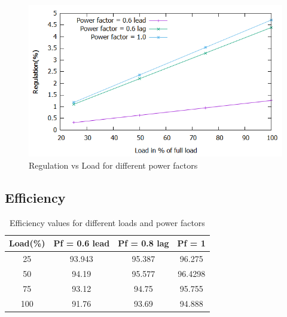 \documentclass[12pt]{article}
\begin{document}
            \begin{figure}[H]
                \centering
                \includegraphics[width = \linewidth]{LAB-2/Regu_vs_load.png}
                \caption{Regulation vs Load for different power factors}
            \end{figure}
                
        \subsection{Efficiency}
        
              \begin{table}[H]
                \centering
                \begin{tabular}{|c|c|c|c|}
                \hline
                    Load(\%) & Pf = 0.6 lead & Pf = 0.8 lag & Pf = 1 \\\hline
                    25 & 93.943 & 95.387 & 96.275 \\\hline 
                    50 & 94.19 & 95.577 & 96.4298 \\\hline
                    75 & 93.12 & 94.75 & 95.755 \\\hline
                    100 & 91.76 & 93.69 & 94.888 \\\hline
                \end{tabular}
                \caption{Efficiency values for different loads and power factors}
            \end{table}  
            
\end{document}
